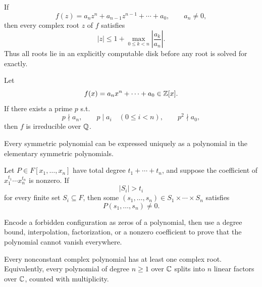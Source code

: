     \begin{theorem}
        If
        \[
            f(z)=a_nz^n+a_{n-1}z^{n-1}+\cdots+a_0,
            \qquad
            a_n\neq0,
        \]
        then every complex root $z$ of $f$ satisfies
        \[
            |z|
            \leq
            1+
            \max_{0\leq k<n}\left|\frac{a_k}{a_n}\right|.
        \]
        Thus all roots lie in an explicitly computable disk before any root is
        solved for exactly.
    \end{theorem}

    \begin{theorem}
        Let
        \[
            f(x)=a_nx^n+\cdots+a_0\in\mathbb{Z}[x].
        \]
        If there exists a prime $p$ s.t.
        \[
            p\nmid a_n,
            \qquad
            p\mid a_i\quad(0\leq i<n),
            \qquad
            p^2\nmid a_0,
        \]
        then $f$ is irreducible over $\mathbb{Q}$.
    \end{theorem}

    \begin{theorem}
        Every symmetric polynomial can be expressed uniquely as a polynomial in
        the elementary symmetric polynomials.
    \end{theorem}

    \begin{theorem}
        Let $P\in F[x_1,\dots,x_n]$ have total degree
        $t_1+\cdots+t_n$, and suppose the coefficient of
        $x_1^{t_1}\cdots x_n^{t_n}$ is nonzero. If
        \[
            |S_i|>t_i
        \]
        for every finite set $S_i\subseteq F$, then some
        $(s_1,\dots,s_n)\in S_1\times\cdots\times S_n$ satisfies
        \[
            P(s_1,\dots,s_n)\neq0.
        \]
    \end{theorem}

    \begin{strategy}
        Encode a forbidden configuration as zeros of a polynomial, then use a
        degree bound, interpolation, factorization, or a nonzero coefficient to
        prove that the polynomial cannot vanish everywhere.
    \end{strategy}

    \begin{theorem}
        Every nonconstant complex polynomial has at least one complex root.
        Equivalently, every polynomial of degree $n\geq 1$ over $\mathbb{C}$ splits into
        $n$ linear factors over $\mathbb{C}$, counted with multiplicity.
    \end{theorem}

